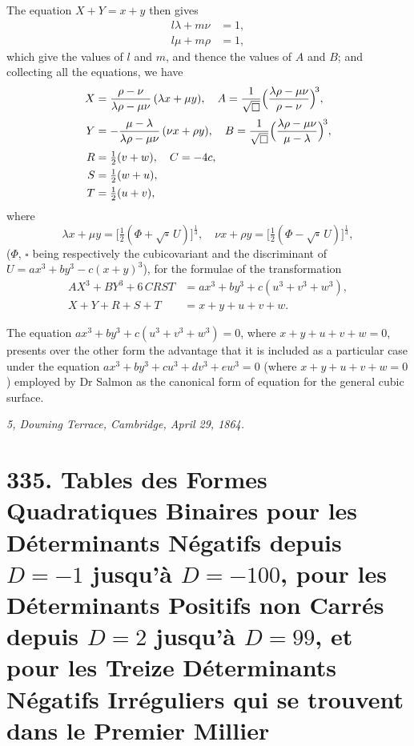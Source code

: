 \documentclass[11pt,a4paper]{article}
\theoremstyle{plain}
\begin{document}
\newpage
The equation $X + Y = x + y$ then gives
\begin{align*}
l\lambda + m\nu &= 1,\\
l\mu + m\rho &= 1,
\end{align*}
which give the values of $l$ and $m$, and thence the values of $A$ and $B$; and collecting all the equations, we have
\begin{align*}
X &= \frac{\rho - \nu}{\lambda\rho - \mu\nu}\,(\lambda x + \mu y),\quad A = \frac{1}{\sqrt{\square}}\Bigl(\frac{\lambda\rho - \mu\nu}{\rho - \nu}\Bigr)^{\!3},\\[2pt]
Y &= -\frac{\mu - \lambda}{\lambda\rho - \mu\nu}\,(\nu x + \rho y),\quad B = \frac{1}{\sqrt{\square}}\Bigl(\frac{\lambda\rho - \mu\nu}{\mu - \lambda}\Bigr)^{\!3},\\[2pt]
R &= \tfrac{1}{2}(v + w),\quad C = -4c,\\
S &= \tfrac{1}{2}(w + u),\\
T &= \tfrac{1}{2}(u + v),
\end{align*}
where
\[
\lambda x + \mu y = \bigl[\tfrac{1}{2}(\Phi + \sqrt{\square}\,U)\bigr]^{\frac{1}{3}},\quad \nu x + \rho y = \bigl[\tfrac{1}{2}(\Phi - \sqrt{\square}\,U)\bigr]^{\frac{1}{3}},
\]
($\Phi$, $\square$ being respectively the cubicovariant and the discriminant of $U = a x^3 + b y^3 - c(x + y)^3$), for the formulae of the transformation
\begin{align*}
AX^3 + BY^3 + 6\,CRST &= a x^3 + b y^3 + c(u^3 + v^3 + w^3),\\
X + Y + R + S + T &= x + y + u + v + w.
\end{align*}

The equation $a x^3 + b y^3 + c(u^3 + v^3 + w^3) = 0$, where $x + y + u + v + w = 0$, presents over the other form the advantage that it is included as a particular case under the equation $a x^3 + b y^3 + c u^3 + d v^3 + e w^3 = 0$ (where $x + y + u + v + w = 0$) employed by Dr Salmon as the canonical form of equation for the general cubic surface.

\medskip
\noindent\textit{5, Downing Terrace, Cambridge, April 29, 1864.}

\newpage
\section*{335. Tables des Formes Quadratiques Binaires pour les D\'eterminants N\'egatifs depuis $D = -1$ jusqu'\`a $D = -100$, pour les D\'eterminants Positifs non Carr\'es depuis $D = 2$ jusqu'\`a $D = 99$, et pour les Treize D\'eterminants N\'egatifs Irr\'eguliers qui se trouvent dans le Premier Millier}
\end{document}
